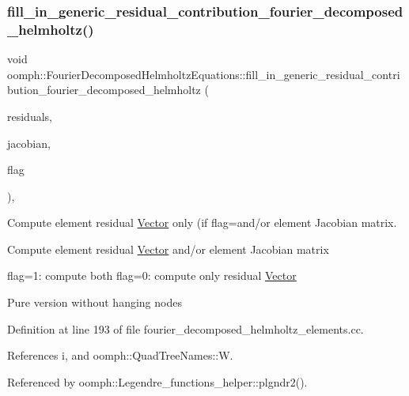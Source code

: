 \subsubsection{\texorpdfstring{fill\+\_\+in\+\_\+generic\+\_\+residual\+\_\+contribution\+\_\+fourier\+\_\+decomposed\+\_\+helmholtz()}{fill\_in\_generic\_residual\_contribution\_fourier\_decomposed\_helmholtz()}}
{\footnotesize\ttfamily void oomph\+::\+Fourier\+Decomposed\+Helmholtz\+Equations\+::fill\+\_\+in\+\_\+generic\+\_\+residual\+\_\+contribution\+\_\+fourier\+\_\+decomposed\+\_\+helmholtz (\begin{DoxyParamCaption}\item[{\hyperlink{classoomph_1_1Vector}{Vector}$<$ double $>$ \&}]{residuals,  }\item[{\hyperlink{classoomph_1_1DenseMatrix}{Dense\+Matrix}$<$ double $>$ \&}]{jacobian,  }\item[{const unsigned \&}]{flag }\end{DoxyParamCaption})\hspace{0.3cm}{\ttfamily [protected]}, {\ttfamily [virtual]}}



Compute element residual \hyperlink{classoomph_1_1Vector}{Vector} only (if flag=and/or element Jacobian matrix. 

Compute element residual \hyperlink{classoomph_1_1Vector}{Vector} and/or element Jacobian matrix

flag=1\+: compute both flag=0\+: compute only residual \hyperlink{classoomph_1_1Vector}{Vector}

Pure version without hanging nodes 

Definition at line 193 of file fourier\+\_\+decomposed\+\_\+helmholtz\+\_\+elements.\+cc.



References i, and oomph\+::\+Quad\+Tree\+Names\+::W.



Referenced by oomph\+::\+Legendre\+\_\+functions\+\_\+helper\+::plgndr2().

\mbox{\label{classoomph_1_1FourierDecomposedHelmholtzEquations_afef1039f83ac578a7e41b4f29387e4ea}} 
